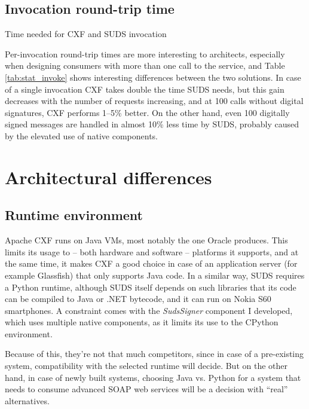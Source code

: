 \subsection{Invocation round-trip time}

\begin{table}[htbp]
 \begin{center}
  
  \caption{Time needed for CXF and SUDS invocation}
  \label{tab:stat_invoke}
 \end{center}
\end{table}

\noindent
Per-invocation round-trip times are more interesting to architects, especially when designing consumers with more than one call to the service, and Table \ref{tab:stat_invoke} shows interesting differences between the two solutions. In case of a single invocation CXF takes double the time SUDS needs, but this gain decreases with the number of requests increasing, and at 100 calls without digital signatures, CXF performs 1--5\% better. On the other hand, even 100 digitally signed messages are handled in almost 10\% less time by SUDS, probably caused by the elevated use of native components.

\section{Architectural differences}

\subsection{Runtime environment}

Apache CXF runs on Java VMs, most notably the one Oracle produces. This limits its usage to -- both hardware and software -- platforms it supports, and at the same time, it makes CXF a good choice in case of an application server (for example Glassfish) that only supports Java code. In a similar way, SUDS requires a Python runtime, although SUDS itself depends on such libraries that its code can be compiled to Java or .NET bytecode, and it can run on Nokia S60 smartphones. A constraint comes with the \emph{SudsSigner} component I developed, which uses multiple native components, as it limits its use to the CPython environment.

Because of this, they're not that much competitors, since in case of a pre-existing system, compatibility with the selected runtime will decide. But on the other hand, in case of newly built systems, choosing Java vs. Python for a system that needs to consume advanced SOAP web services will be a decision with ``real'' alternatives.

